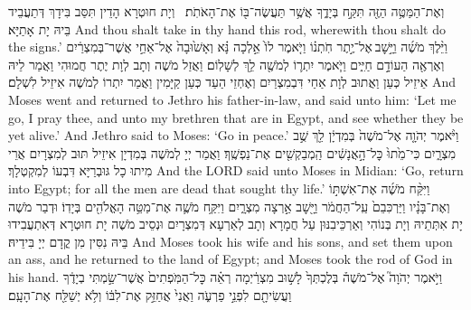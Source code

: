 {{וְאֶת־הַמַּטֶּ֥ה הַזֶּ֖ה תִּקַּ֣ח בְּיָדֶ֑ךָ אֲשֶׁ֥ר תַּעֲשֶׂה־בּ֖וֹ אֶת־הָאֹתֹֽת׃ \petucha }
{וְיָת חוּטְרָא הָדֵין תִּסַּב בִּידָךְ דְּתַעֲבֵיד בֵּיהּ יָת אָתַיָּא׃}
{And thou shalt take in thy hand this rod, wherewith thou shalt do the signs.’}{}
{וַיֵּ֨לֶךְ מֹשֶׁ֜ה וַיָּ֣שׇׁב \legarmeh  אֶל־יֶ֣תֶר חֹֽתְנ֗וֹ וַיֹּ֤אמֶר לוֹ֙ אֵ֣לְכָה נָּ֗א וְאָשׁ֙וּבָה֙ אֶל־אַחַ֣י אֲשֶׁר־בְּמִצְרַ֔יִם וְאֶרְאֶ֖ה הַעוֹדָ֣ם חַיִּ֑ים וַיֹּ֧אמֶר יִתְר֛וֹ לְמֹשֶׁ֖ה לֵ֥ךְ לְשָׁלֽוֹם׃
}
{וַאֲזַל מֹשֶׁה וְתָב לְוָת יֶתֶר חֲמוּהִי וַאֲמַר לֵיהּ אֵיזֵיל כְּעַן וַאֲתוּב לְוָת אַחַי דִּבְמִצְרַיִם וְאֶחְזֵי הַעַד כְּעַן קַיָּמִין וַאֲמַר יִתְרוֹ לְמֹשֶׁה אִיזֵיל לִשְׁלָם׃}
{And Moses went and returned to Jethro his father-in-law, and said unto him: ‘Let me go, I pray thee, and unto my brethren that are in Egypt, and see whether they be yet alive.’ And Jethro said to Moses: ‘Go in peace.’}{}
{וַיֹּ֨אמֶר יְהֹוָ֤ה אֶל־מֹשֶׁה֙ בְּמִדְיָ֔ן לֵ֖ךְ שֻׁ֣ב מִצְרָ֑יִם כִּי־מֵ֙תוּ֙ כׇּל־הָ֣אֲנָשִׁ֔ים הַֽמְבַקְשִׁ֖ים אֶת־נַפְשֶֽׁךָ׃
}
{וַאֲמַר יְיָ לְמֹשֶׁה בְּמִדְיָן אִיזֵיל תּוּב לְמִצְרָיִם אֲרֵי מִיתוּ כָל גּוּבְרַיָּא דִּבְעוֹ לְמִקְטְלָךְ׃}
{And the LORD said unto Moses in Midian: ‘Go, return into Egypt; for all the men are dead that sought thy life.’}{}
{וַיִּקַּ֨ח מֹשֶׁ֜ה אֶת־אִשְׁתּ֣וֹ וְאֶת־בָּנָ֗יו וַיַּרְכִּבֵם֙ עַֽל־הַחֲמֹ֔ר וַיָּ֖שׇׁב אַ֣רְצָה מִצְרָ֑יִם וַיִּקַּ֥ח מֹשֶׁ֛ה אֶת־מַטֵּ֥ה הָאֱלֹהִ֖ים בְּיָדֽוֹ׃
}
{וּדְבַר מֹשֶׁה יָת אִתְּתֵיהּ וְיָת בְּנוֹהִי וְאַרְכֵּיבִנּוּן עַל חֲמָרָא וְתָב לְאַרְעָא דְּמִצְרָיִם וּנְסֵיב מֹשֶׁה יָת חוּטְרָא דְּאִתְעֲבִידוּ בֵּיהּ נִסִּין מִן קֳדָם יְיָ בִּידֵיהּ׃}
{And Moses took his wife and his sons, and set them upon an ass, and he returned to the land of Egypt; and Moses took the rod of God in his hand.}{}
{וַיֹּ֣אמֶר יְהֹוָה֮ אֶל־מֹשֶׁה֒ בְּלֶכְתְּךָ֙ לָשׁ֣וּב מִצְרַ֔יְמָה רְאֵ֗ה כׇּל־הַמֹּֽפְתִים֙ אֲשֶׁר־שַׂ֣מְתִּי בְיָדֶ֔ךָ וַעֲשִׂיתָ֖ם לִפְנֵ֣י פַרְעֹ֑ה וַאֲנִי֙ אֲחַזֵּ֣ק אֶת־לִבּ֔וֹ וְלֹ֥א יְשַׁלַּ֖ח אֶת־הָעָֽם׃
}}
